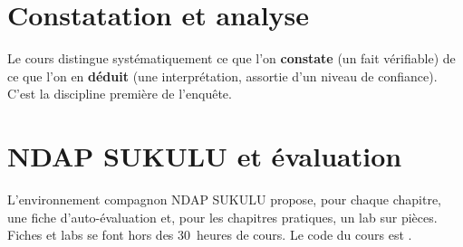 \section*{Constatation et analyse}

Le cours distingue systématiquement ce que l'on \textbf{constate} (un fait
vérifiable) de ce que l'on en \textbf{déduit} (une interprétation, assortie
d'un niveau de confiance). C'est la discipline première de l'enquête.

\section*{NDAP SUKULU et évaluation}

L'environnement compagnon NDAP SUKULU propose, pour chaque chapitre, une fiche
d'auto-évaluation et, pour les chapitres pratiques, un lab sur pièces. Fiches
et labs se font hors des 30~heures de cours. Le code du cours est
\textbf{\codeUE}.
